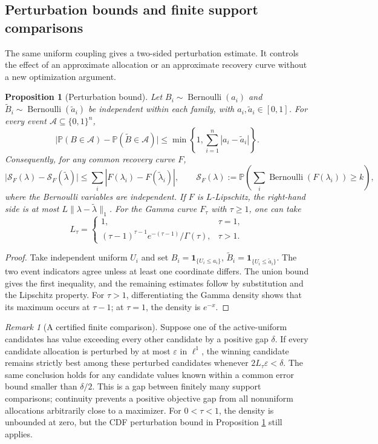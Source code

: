\documentclass[11pt]{article}
\newtheorem{proposition}{Proposition}
\theoremstyle{definition}
\theoremstyle{remark}
\newtheorem{remark}{Remark}
\DeclareMathOperator{\Bernoulli}{Bernoulli}
\newcommand{\Pbb}{\mathbb P}
\newcommand{\1}{\mathbf 1}
\begin{document}
\subsection{Perturbation bounds and finite support comparisons}

The same uniform coupling gives a two-sided perturbation estimate.  It
controls the effect of an approximate allocation or an approximate
recovery curve without a new optimization argument.

\begin{proposition}[Perturbation bound]
\label{prop:recovery-perturbation}
Let \(B_i\sim\Bernoulli(a_i)\) and
\(\widetilde B_i\sim\Bernoulli(\widetilde a_i)\) be independent
within each family, with \(a_i,\widetilde a_i\in[0,1]\).  For
every event \(\mathcal A\subseteq\{0,1\}^n\),
\[
 \bigl|\Pbb(B\in\mathcal A)
       -\Pbb(\widetilde B\in\mathcal A)\bigr|
 \le \min\left\{1,\sum_{i=1}^n|a_i-\widetilde a_i|\right\}.
\]
Consequently, for any common recovery curve \(F\),
\[
 \bigl|\mathcal S_F(\lambda)-\mathcal S_F(\widetilde\lambda)\bigr|
 \le \sum_i|F(\lambda_i)-F(\widetilde\lambda_i)|,
 \qquad
 \mathcal S_F(\lambda)
 :=\Pbb\!\left(\sum_i\Bernoulli(F(\lambda_i))\ge k\right),
\]
where the Bernoulli variables are independent.  If \(F\) is
\(L\)-Lipschitz, the right-hand side is at most
\(L\|\lambda-\widetilde\lambda\|_1\).  For the Gamma curve
\(F_\tau\) with \(\tau\ge1\), one can take
\[
 L_\tau=
 \begin{cases}
  1,&\tau=1,\\[2pt]
  (\tau-1)^{\tau-1}e^{-(\tau-1)}/\Gamma(\tau),&\tau>1.
 \end{cases}
\]
\end{proposition}

\begin{proof}
Take independent uniform \(U_i\) and set
\(B_i=\1_{\{U_i\le a_i\}}\),
\(\widetilde B_i=\1_{\{U_i\le\widetilde a_i\}}\).
The two event indicators agree unless at least one coordinate
differs.  The union bound gives the first inequality, and the
remaining estimates follow by substitution and the Lipschitz
property.  For \(\tau>1\), differentiating the Gamma density
shows that its maximum occurs at \(\tau-1\); at \(\tau=1\),
the density is \(e^{-x}\).
\end{proof}

\begin{remark}[A certified finite comparison]
Suppose one of the active-uniform candidates has value exceeding
every other candidate by a positive gap \(\delta\).  If every
candidate allocation is perturbed by at most \(\varepsilon\) in
\(\ell^1\), the winning candidate remains strictly best among
these perturbed candidates whenever
\(2L_\tau\varepsilon<\delta\).  The same conclusion holds for
any candidate values known within a common error bound smaller
than \(\delta/2\).  This is a gap between finitely many support
comparisons; continuity prevents a positive objective gap from
all nonuniform allocations arbitrarily close to a maximizer.
For \(0<\tau<1\), the density is unbounded at zero, but the
CDF perturbation bound in Proposition
\ref{prop:recovery-perturbation} still applies.
\end{remark}
\end{document}
